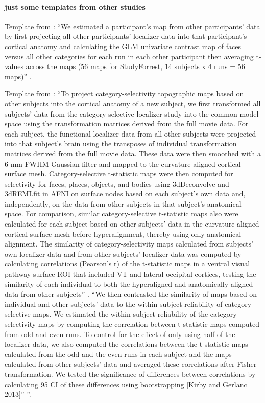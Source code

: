 \paragraph{just some templates from other studies}

Template from \citet{jiahui2020predicting}: ``We estimated a participant's map
from other participants' data by first projecting all other participants'
localizer data into that participant's cortical anatomy and calculating the GLM
univariate contrast map of faces versus all other categories for each run in
each other participant then averaging t-values across the maps (56 maps for
StudyForrest, 14 subjects x 4 runs = 56 maps)'' \citep{jiahui2020predicting}.

%
Template from \citet{guntupalli2016model}: ``To project category-selectivity
topographic maps based on other subjects into the cortical anatomy of a new
subject, we first transformed all subjects' data from the category-selective
localizer study into the common model space using the transformation matrices
derived from the full movie data. For each subject, the functional localizer
data from all other subjects were projected into that subject's brain using the
transposes of individual transformation matrices derived from the full movie
data. These data were then smoothed with a 6 mm FWHM Gaussian filter and mapped
to the curvature-aligned cortical surface mesh. Category-selective t-statistic
maps were then computed for selectivity for faces, places, objects, and bodies
using 3dDeconvolve and 3dREMLﬁt in AFNI on surface nodes based on each subject's
own data and, independently, on the data from other subjects in that subject's
anatomical space. For comparison, similar category-selective t-statistic maps
also were calculated for each subject based on other subjects' data in the
curvature-aligned cortical surface mesh before hyperalignment, thereby using
only anatomical alignment. The similarity of category-selectivity maps
calculated from subjects' own localizer data and from other subjects' localizer
data was computed by calculating correlations (Pearson's r) of the t-statistic
maps in a ventral visual pathway surface ROI that included VT and lateral
occipital cortices, testing the similarity of each individual to both the
hyperaligned and anatomically aligned data from other subjects''
\citep{guntupalli2016model}.
%
``We then contrasted the similarity of maps based on individual and other
subjects' data to the within-subject reliability of category-selective maps. We
estimated the within-subject reliability of the category-selectivity maps by
computing the correlation between t-statistic maps computed from odd and even
runs. To control for the effect of only using half of the localizer data, we
also computed the correlations between the t-statistic maps calculated from the
odd and the even runs in each subject and the maps calculated from other
subjects' data and averaged these correlations after Fisher transformation. We
tested the significance of differences between correlations by calculating 95%
CI of these differences using bootstrapping [Kirby and Gerlanc 2013]''
\citep{guntupalli2016model}''.


